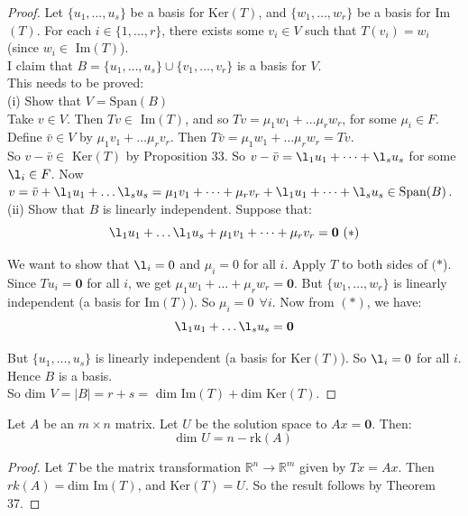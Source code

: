 \documentclass[twoside]{scrartcl}
\begin{document}
\begin{proof}
Let $\{u_1,\dots,u_s\}$ be a basis for Ker$(T)$, and $\{w_1,\dots,w_r\}$ be a basis for Im$(T)$. For each $i \in \{1,\dots,r\}$, there exists some $v_i \in V$ such that $T(v_i) = w_i$ (since $w_i \in $ Im$(T)$).\\

I claim that $B = \{u_1,\dots,u_s\} \cup \{v_1,\dots,v_r\}$ is a basis for $V$.\\
This needs to be proved:\\

(i) Show that $V = \text{Span}(B)$\\

Take $v \in V$. Then $Tv \in $ Im$(T)$, and so $Tv = \mu_1w_1 + \dots \mu_rw_r$, for some $\mu_i \in F$. Define $\bar{v} \in V$ by $\mu_1v_1 + \dots \mu_rv_r$. Then $T\bar{v} = \mu_1w_1 + \dots \mu_rw_r = Tv$.\\ So $v - \bar{v} \in $ Ker$(T)$ by Proposition 33. So $v - \bar{v} = \l_1u_1 + \dots + \l_su_s$ for some $\l_i \in F$. Now $v = \bar{v} + \l_1u_1 + \dots \l_su_s = \mu_1v_1 + \dots + \mu_rv_r + \l_1u_1 + \dots + \l_su_s \in \text{Span}(B)$.\\

(ii) Show that $B$ is linearly independent. Suppose that:
 \[\l_1u_1 + \dots \l_1u_s + \mu_1v_1 + \dots + \mu_rv_r = \mathbf{0} ~(*)\]
 
 We want to show that $\l_i = 0$ and $\mu_i = 0$ for all $i$. Apply $T$ to both sides of $(*$). Since $Tu_i = \mathbf{0}$ for all $i$, we get $\mu_1w_1 + \dots + \mu_rw_r = \mathbf{0}$. But $\{w_1,\dots,w_r\}$ is linearly independent (a basis for Im$(T)$). So $\mu_i = 0~~ \forall i$. Now from $(*)$, we have:
\[\l_1u_1 + \dots \l_su_s = \mathbf{0}\]

But $\{u_1,\dots,u_s\}$ is linearly independent (a basis for Ker$(T)$). So $\l_i = 0$ for all $i$. Hence $B$ is a basis.\\

 So dim $V = |B| = r + s = $ dim Im$(T) + $dim Ker$(T)$.
\end{proof}\vspace*{10pt}


\begin{corollary} Let $A$ be an $m\times n$ matrix. Let $U$ be the solution space to $Ax = \mathbf{0}$. Then:
\[\text{dim }U = n - \text{rk}(A)\]
\end{corollary}


\begin{proof}
Let $T$ be the matrix transformation $\mathbb{R}^n \to \mathbb{R}^m$ given by $Tx = Ax$. Then $rk(A) = $dim Im$(T)$, and Ker$(T) = U$. So the result follows by Theorem 37.
\end{proof}
\end{document}
